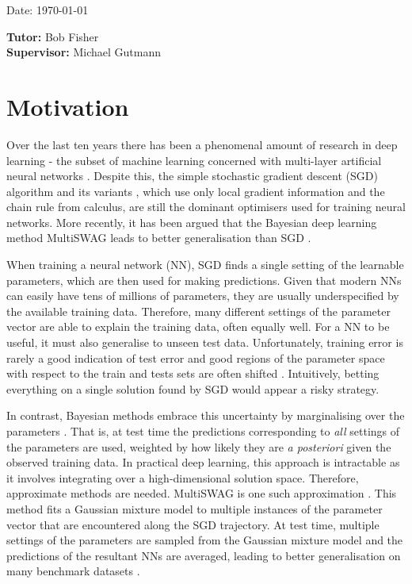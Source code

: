 \documentclass[a4paper,11pt]{article}
\newcommand{\tutor}{Bob Fisher}
\newcommand{\supervisor}{Michael Gutmann}
\begin{document}
\vspace*{3cm}
Date: \today

\vfill
{\bf Tutor:} \tutor\\
{\bf Supervisor:} \supervisor
\newpage

\setcounter{page}{1}                            %
\footruleheight{1pt}
\headruleheight{1pt}
\rhead{- \thepage}
\cfoot{}
%


\section{Motivation}

Over the last ten years there has been a phenomenal amount of research in deep learning - the subset of machine learning concerned with multi-layer artificial neural networks \cite{goodfellow2016}. Despite this, the simple stochastic gradient descent (SGD) algorithm and its variants \cite{ruder2016}  \cite{duchi2011} \cite{zeiler2012}  \cite{kingma2014}, which use only local gradient information and the chain rule from calculus, are still the dominant optimisers used for training neural networks. More recently, it has been argued that the Bayesian deep learning method MultiSWAG leads to better generalisation than SGD \cite{izmailov2020} .

When training a neural network (NN), SGD finds a single setting of the learnable parameters, which are then used for making predictions. Given that modern NNs can easily have tens of millions of parameters, they are usually underspecified by the available training data. Therefore, many different settings of the parameter vector are able to explain the training data, often equally well. 
For a NN to be useful, it must also generalise to unseen test data.  Unfortunately, training error is rarely a good indication of test error and good regions of the parameter space with respect to the train and tests sets are often shifted \cite{izmailov2018}. Intuitively, betting everything on a single solution found by SGD would appear a risky strategy. 

In contrast, Bayesian methods embrace this uncertainty by marginalising over the parameters \cite{wilson2020}. That is, at test time the predictions corresponding to \emph{all} settings of the parameters are used, weighted by how likely they are \emph{a posteriori} given the observed training data. In practical deep learning, this approach is intractable as it involves integrating over a high-dimensional solution space. Therefore, approximate methods are needed. MultiSWAG is one such approximation \cite{izmailov2020}. This method fits a Gaussian mixture model \cite{barber2007} to multiple instances of the parameter vector that are encountered along the SGD trajectory. At test time, multiple settings of the parameters are sampled from the Gaussian mixture model and the predictions of the resultant NNs are averaged, leading to better generalisation on many benchmark datasets \cite{izmailov2020}.
\end{document}
